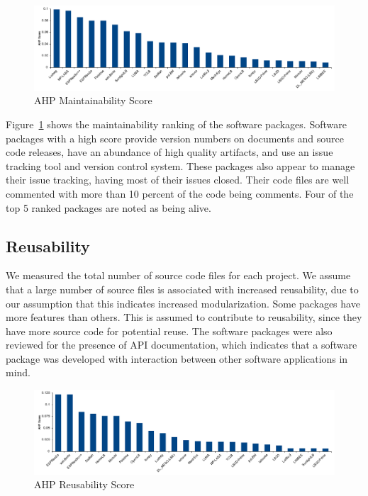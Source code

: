 \documentclass[final, 3p, times, authoryear]{elsarticle}
\begin{document}
\begin{figure}[h!]
	\begin{center}
		\includegraphics[width=1.0\textwidth]{./figures/maintainability_chart.pdf}
		\caption{AHP Maintainability Score}
		\label{Fig_Maintainability}
	\end{center}
\end{figure}

Figure~\ref{Fig_Maintainability} shows the maintainability ranking of the
software packages. Software packages with a high score provide version numbers
on documents and source code releases, have an abundance of high quality
artifacts, and use an issue tracking tool and version control system. These
packages also appear to manage their issue tracking, having most of their issues
closed. Their code files are well commented with more than 10 percent of the
code being comments. Four of the top 5 ranked packages are noted as being alive.

\subsection{Reusability} \label{reusabilityresults}

We measured the total number of source code files for each project. We assume
that a large number of source files is associated with increased reusability,
due to our assumption that this indicates increased modularization. Some
packages have more features than others.  This is assumed to contribute to
reusability, since they have more source code for potential reuse. The software
packages were also reviewed for the presence of API documentation, which
indicates that a software package was developed with interaction between other
software applications in mind. 

\begin{figure}[h!]
	\begin{center}
		\includegraphics[width=1.0\textwidth]{./figures/reusability_chart.pdf}
		\caption{AHP Reusability Score}
		\label{Fig_Reusabilty}
	\end{center}
\end{figure}
\end{document}
